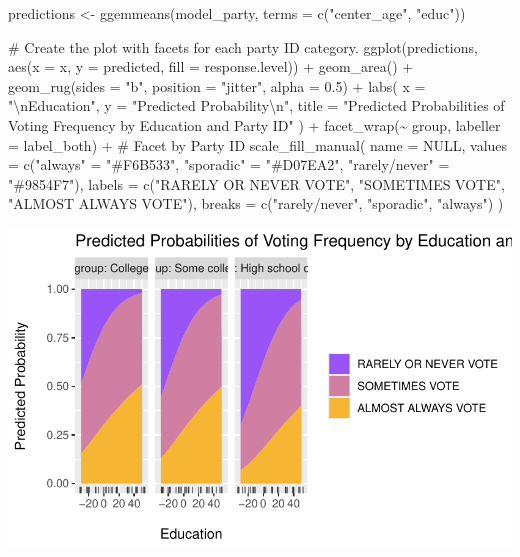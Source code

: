 \documentclass[
  letterpaper,
  DIV=11,
  numbers=noendperiod]{scrartcl}
\newenvironment{Shaded}{\begin{snugshade}}{\end{snugshade}}
\newcommand{\AttributeTok}[1]{\textcolor[rgb]{0.40,0.45,0.13}{#1}}
\newcommand{\CommentTok}[1]{\textcolor[rgb]{0.37,0.37,0.37}{#1}}
\newcommand{\ConstantTok}[1]{\textcolor[rgb]{0.56,0.35,0.01}{#1}}
\newcommand{\FloatTok}[1]{\textcolor[rgb]{0.68,0.00,0.00}{#1}}
\newcommand{\FunctionTok}[1]{\textcolor[rgb]{0.28,0.35,0.67}{#1}}
\newcommand{\NormalTok}[1]{\textcolor[rgb]{0.00,0.23,0.31}{#1}}
\newcommand{\OtherTok}[1]{\textcolor[rgb]{0.00,0.23,0.31}{#1}}
\newcommand{\SpecialCharTok}[1]{\textcolor[rgb]{0.37,0.37,0.37}{#1}}
\newcommand{\StringTok}[1]{\textcolor[rgb]{0.13,0.47,0.30}{#1}}
\begin{document}
\begin{Shaded}
\begin{Highlighting}[]
\NormalTok{predictions }\OtherTok{\textless{}{-}} \FunctionTok{ggemmeans}\NormalTok{(model\_party, }\AttributeTok{terms =} \FunctionTok{c}\NormalTok{(}\StringTok{"center\_age"}\NormalTok{, }\StringTok{"educ"}\NormalTok{))}

\CommentTok{\# Create the plot with facets for each party ID category.}
\FunctionTok{ggplot}\NormalTok{(predictions, }\FunctionTok{aes}\NormalTok{(}\AttributeTok{x =}\NormalTok{ x, }\AttributeTok{y =}\NormalTok{ predicted, }\AttributeTok{fill =}\NormalTok{ response.level)) }\SpecialCharTok{+}
  \FunctionTok{geom\_area}\NormalTok{() }\SpecialCharTok{+}
  \FunctionTok{geom\_rug}\NormalTok{(}\AttributeTok{sides =} \StringTok{"b"}\NormalTok{, }\AttributeTok{position =} \StringTok{"jitter"}\NormalTok{, }\AttributeTok{alpha =} \FloatTok{0.5}\NormalTok{) }\SpecialCharTok{+}
  \FunctionTok{labs}\NormalTok{(}
    \AttributeTok{x =} \StringTok{"}\SpecialCharTok{\textbackslash{}n}\StringTok{Education"}\NormalTok{,}
    \AttributeTok{y =} \StringTok{"Predicted Probability}\SpecialCharTok{\textbackslash{}n}\StringTok{"}\NormalTok{,}
    \AttributeTok{title =} \StringTok{"Predicted Probabilities of Voting Frequency by Education and Party ID"}
\NormalTok{  ) }\SpecialCharTok{+}
  \FunctionTok{facet\_wrap}\NormalTok{(}\SpecialCharTok{\textasciitilde{}}\NormalTok{ group, }\AttributeTok{labeller =}\NormalTok{ label\_both) }\SpecialCharTok{+}  \CommentTok{\# Facet by Party ID}
  \FunctionTok{scale\_fill\_manual}\NormalTok{(}
    \AttributeTok{name =} \ConstantTok{NULL}\NormalTok{,}
    \AttributeTok{values =} \FunctionTok{c}\NormalTok{(}\StringTok{"always"} \OtherTok{=} \StringTok{"\#F6B533"}\NormalTok{, }\StringTok{"sporadic"} \OtherTok{=} \StringTok{"\#D07EA2"}\NormalTok{, }\StringTok{"rarely/never"} \OtherTok{=} \StringTok{"\#9854F7"}\NormalTok{),}
    \AttributeTok{labels =} \FunctionTok{c}\NormalTok{(}\StringTok{"RARELY OR NEVER VOTE"}\NormalTok{, }\StringTok{"SOMETIMES VOTE"}\NormalTok{, }\StringTok{"ALMOST ALWAYS VOTE"}\NormalTok{),}
    \AttributeTok{breaks =} \FunctionTok{c}\NormalTok{(}\StringTok{"rarely/never"}\NormalTok{, }\StringTok{"sporadic"}\NormalTok{, }\StringTok{"always"}\NormalTok{)}
\NormalTok{  )}
\end{Highlighting}
\end{Shaded}

\includegraphics{Lab4_multinom_Questions-1_files/figure-pdf/unnamed-chunk-16-1.pdf}
\end{document}
